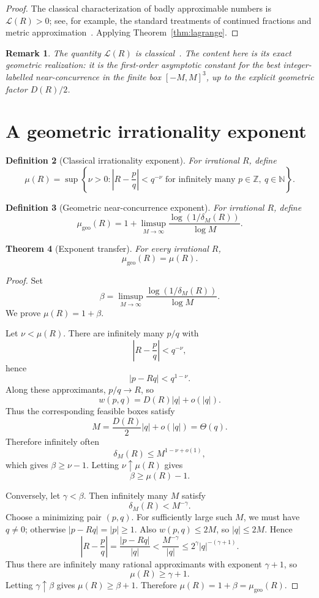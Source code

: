 \documentclass[11pt,a4paper]{article}
\newcommand{\deltam}{\delta_M}
\newtheorem{theorem}{Theorem}[section]
\newtheorem{definition}[theorem]{Definition}
\newtheorem{remark}[theorem]{Remark}
\begin{document}
\begin{proof}
The classical characterization of badly approximable numbers is $\mathcal L(R)>0$; see, for example, the standard treatments of continued fractions and metric approximation~\cite{cassels,khintchine1924,harman1998}. Applying
Theorem~\ref{thm:lagrange}.
\end{proof}

\begin{remark}
The quantity $\mathcal L(R)$ is classical~\cite{cassels,schmidt1980}. The content here is its exact geometric realization:
it is the first-order asymptotic constant for the best integer-labelled near-concurrence in the
finite box $[-M,M]^3$, up to the explicit geometric factor $D(R)/2$.
\end{remark}

\section{A geometric irrationality exponent}

\begin{definition}[Classical irrationality exponent]
For irrational $R$, define
\[
\mu(R)=
\sup\left\{\nu>0:\left|R-\frac pq\right|<q^{-\nu}
\text{ for infinitely many }p\in\mathbb Z,\ q\in\mathbb N\right\}.
\]
\end{definition}

\begin{definition}[Geometric near-concurrence exponent]
For irrational $R$, define
\[
\mu_{\mathrm{geo}}(R)=1+
\limsup_{M\to\infty}\frac{\log(1/\deltam(R))}{\log M}.
\]
\end{definition}

\begin{theorem}[Exponent transfer]\label{thm:exponent}
For every irrational $R$,
\[
\boxed{\mu_{\mathrm{geo}}(R)=\mu(R).}
\]
\end{theorem}

\begin{proof}
Set
\[
\beta=
\limsup_{M\to\infty}
\frac{\log(1/\deltam(R))}{\log M}.
\]
We prove $\mu(R)=1+\beta$.

Let $\nu<\mu(R)$. There are infinitely many $p/q$ with
\[
\left|R-\frac pq\right|<q^{-\nu},
\]
hence
\[
|p-Rq|<q^{1-\nu}.
\]
Along these approximants, $p/q\to R$, so
\[
w(p,q)=D(R)|q|+o(|q|).
\]
Thus the corresponding feasible boxes satisfy
\[
M=\frac{D(R)}2|q|+o(|q|)=\Theta(q).
\]
Therefore infinitely often
\[
\deltam(R)\le M^{1-\nu+o(1)},
\]
which gives $\beta\ge\nu-1$. Letting $\nu\uparrow\mu(R)$ gives
\[
\beta\ge\mu(R)-1.
\]

Conversely, let $\gamma<\beta$. Then infinitely many $M$ satisfy
\[
\deltam(R)<M^{-\gamma}.
\]
Choose a minimizing pair $(p,q)$. For sufficiently large such $M$, we must have $q\ne0$; otherwise
$|p-Rq|=|p|\ge1$. Also $w(p,q)\le2M$, so $|q|\le2M$. Hence
\[
\left|R-\frac pq\right|
=\frac{|p-Rq|}{|q|}
<\frac{M^{-\gamma}}{|q|}
\le2^\gamma |q|^{-(\gamma+1)}.
\]
Thus there are infinitely many rational approximants with exponent $\gamma+1$, so
\[
\mu(R)\ge\gamma+1.
\]
Letting $\gamma\uparrow\beta$ gives $\mu(R)\ge\beta+1$.
Therefore $\mu(R)=1+\beta=\mu_{\mathrm{geo}}(R)$.
\end{proof}
\end{document}
